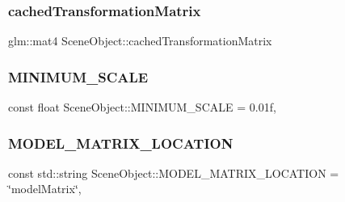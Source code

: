 \subsubsection{\texorpdfstring{cached\+Transformation\+Matrix}{cachedTransformationMatrix}}
{\footnotesize\ttfamily glm\+::mat4 Scene\+Object\+::cached\+Transformation\+Matrix\hspace{0.3cm}{\ttfamily [protected]}}

\hypertarget{class_scene_object_a903eef54277645571794fd87dc8e9fbb}{}\label{class_scene_object_a903eef54277645571794fd87dc8e9fbb} 
\subsubsection{\texorpdfstring{M\+I\+N\+I\+M\+U\+M\+\_\+\+S\+C\+A\+LE}{MINIMUM\_SCALE}}
{\footnotesize\ttfamily const float Scene\+Object\+::\+M\+I\+N\+I\+M\+U\+M\+\_\+\+S\+C\+A\+LE = 0.\+01f\hspace{0.3cm}{\ttfamily [static]}, {\ttfamily [protected]}}

\hypertarget{class_scene_object_a62d236f4f5c52b66bd02d13d09b6ce5e}{}\label{class_scene_object_a62d236f4f5c52b66bd02d13d09b6ce5e} 
\subsubsection{\texorpdfstring{M\+O\+D\+E\+L\+\_\+\+M\+A\+T\+R\+I\+X\+\_\+\+L\+O\+C\+A\+T\+I\+ON}{MODEL\_MATRIX\_LOCATION}}
{\footnotesize\ttfamily const std\+::string Scene\+Object\+::\+M\+O\+D\+E\+L\+\_\+\+M\+A\+T\+R\+I\+X\+\_\+\+L\+O\+C\+A\+T\+I\+ON = \char`\"{}model\+Matrix\char`\"{}\hspace{0.3cm}{\ttfamily [static]}, {\ttfamily [protected]}}

\hypertarget{class_scene_object_ab4aa9bed778001970c38ea11ef34b285}{}\label{class_scene_object_ab4aa9bed778001970c38ea11ef34b285} 
